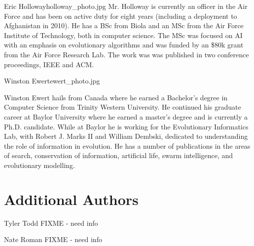 \begin{authorbio}{Eric Holloway}{holloway_photo.jpg}
Mr. Holloway is currently an officer in the Air Force and has been on
active duty for eight years (including a deployment to Afghanistan in
2010). He has a BSc from Biola and an MSc from the Air Force Institute
of Technology, both in computer science. The MSc was focused on AI
with an emphasis on evolutionary algorithms and was funded by an \$80k
grant from the Air Force Research Lab. The work was was published in
two conference proceedings, IEEE and ACM.
\end{authorbio}

\begin{authorbio}{Winston Ewert}{ewert_photo.jpg}

Winston Ewert hails from Canada where he earned a Bachelor's degree in Computer Science from Trinity Western University. He continued his graduate career at Baylor University where he earned a master's degree and is currently a Ph.D. candidate. While at Baylor he is working for the Evolutionary Informatics Lab, with Robert J. Marks II and William Dembski, dedicated to understanding the role of information in evolution. He has a number of publications in the areas of search, conservation of information, artificial life, swarm intelligence, and evolutionary modelling. 
\end{authorbio}


\section*{Additional Authors}
\begin{authorbio}{Tyler Todd}{}
FIXME - need info
\end{authorbio}

\begin{authorbio}{Nate Roman}{}
FIXME - need info
\end{authorbio}

